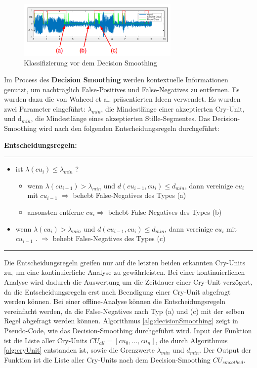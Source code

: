 \begin{figure}[h]
	\centering
	\includegraphics[width=0.7\textwidth]{bilder/smoothing02.png}
	\caption{Klassifizierung vor dem Decision Smoothing}
	\label{img:beforeSmoothing}
\end{figure}

Im Process des \textbf{Decision Smoothing} werden kontextuelle Informationen genutzt, um nachträglich False-Positives und False-Negatives zu entfernen. Es wurden dazu die von Waheed et al. \cite{vad_entropy} präsentierten Ideen verwendet. Es wurden zwei Parameter eingeführt: $\lambda_{min}$, die Mindestlänge einer akzeptierten Cry-Unit, und d$_{min}$, die Mindestlänge eines akzeptierten Stille-Segmentes. Das Decision-Smoothing wird nach den folgenden Entscheidungsregeln durchgeführt:

\textbf{Entscheidungsregeln: }\noindent\rule{0.7\linewidth}{0.3pt}
\begin{itemize}
	\item ist $\lambda (cu_{i}) \leq \lambda_{min}$ ?
	\begin{itemize}
		\item wenn $\lambda (cu_{i-1}) > \lambda_{min}$ und $d (cu_{i-1}, cu_{i}) \leq d_{min}$, dann vereinige $cu_{i}$ mit $cu_{i-1}$ $\Longrightarrow$ behebt False-Negatives des Types (a)
		\item ansonsten entferne $cu_i \Longrightarrow$ behebt False-Negatives des Types (b)
	\end{itemize}
	\item wenn $\lambda (cu_{i}) > \lambda_{min}$ und $d (cu_{i-1}, cu_{i}) \leq d_{min}$, dann vereinige $cu_{i}$ mit $cu_{i-1}$ . $\Rightarrow$ behebt False-Negatives des Types (c)
\end{itemize}
\noindent\rule{\linewidth}{0.3pt}

Die Entscheidungsregeln greifen nur auf die letzten beiden erkannten Cry-Units zu, um eine kontinuierliche Analyse zu gewährleisten. Bei einer kontinuierlichen Analyse wird dadurch die Auswertung um die Zeitdauer einer Cry-Unit verzögert, da die Entscheidungsregeln erst nach Beendigung einer Cry-Unit abgefragt werden können. Bei einer offline-Analyse können die Entscheidungsregeln vereinfacht werden, da die False-Negatives nach Typ (a) und (c) mit der selben Regel abgefragt werden können. Algorithmus \ref{alg:decisionSmoothing} zeigt in Pseudo-Code, wie das Decision-Smoothing durchgeführt wird. Input der Funktion ist die Liste aller Cry-Units $CU_{all} = [cu_0 , \ldots , cu_n]$, die durch Algorithmus \ref{alg:cryUnit} entstanden ist, sowie die Grenzwerte $\lambda_{min}$ und $d_{min}$. Der Output der Funktion ist die Liste aller Cry-Units nach dem Decision-Smoothing $CU_{smoothed}$.

